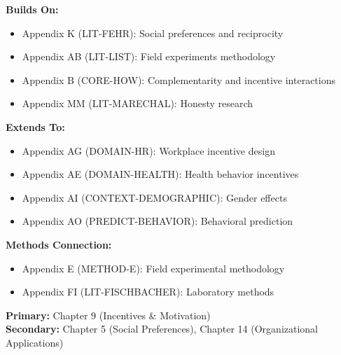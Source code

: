 \begin{tcolorbox}[colback=blue!5!white,colframe=blue!75!black,title=Cross-Reference Map]
\textbf{Builds On:}
\begin{itemize}
    \item Appendix K (LIT-FEHR): Social preferences and reciprocity
    \item Appendix AB (LIT-LIST): Field experiments methodology
    \item Appendix B (CORE-HOW): Complementarity and incentive interactions
    \item Appendix MM (LIT-MARECHAL): Honesty research
\end{itemize}

\textbf{Extends To:}
\begin{itemize}
    \item Appendix AG (DOMAIN-HR): Workplace incentive design
    \item Appendix AE (DOMAIN-HEALTH): Health behavior incentives
    \item Appendix AI (CONTEXT-DEMOGRAPHIC): Gender effects
    \item Appendix AO (PREDICT-BEHAVIOR): Behavioral prediction
\end{itemize}

\textbf{Methods Connection:}
\begin{itemize}
    \item Appendix E (METHOD-E): Field experimental methodology
    \item Appendix FI (LIT-FISCHBACHER): Laboratory methods
\end{itemize}
\end{tcolorbox}

\begin{tcolorbox}[colback=green!5!white,colframe=green!75!black,title=Chapter Linkage]
\textbf{Primary:} Chapter 9 (Incentives \& Motivation) \\
\textbf{Secondary:} Chapter 5 (Social Preferences), Chapter 14 (Organizational Applications)
\end{tcolorbox}

